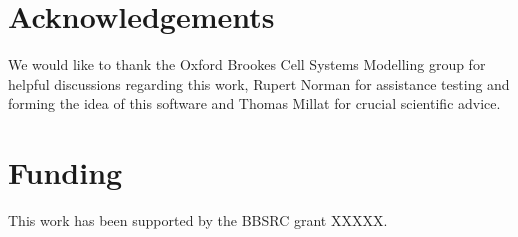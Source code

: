\documentclass[a4paper,10pt]{article}
\begin{document}
\section*{Acknowledgements}
We would like to thank the Oxford Brookes Cell Systems Modelling group for helpful discussions regarding this work, Rupert Norman for assistance testing and forming the idea of this software and Thomas Millat for crucial scientific advice.

\section*{Funding}
This work has been supported by the BBSRC grant XXXXX.




\end{document}

